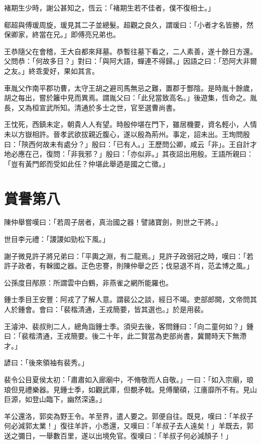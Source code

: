 褚期生少時，謝公甚知之，恆云：「褚期生若不佳者，僕不復相士。」

郗超與傅瑗周旋，瑗見其二子並總髮。超觀之良久，謂瑗曰：「小者才名皆勝，然保卿家，終當在兄。」即傅亮兄弟也。

王恭隨父在會稽，王大自都來拜墓。恭暫往墓下看之，二人素善，遂十餘日方還。父問恭：「何故多日？」對曰：「與阿大語，蟬連不得歸。」因語之曰：「恐阿大非爾之友。」終乖愛好，果如其言。

車胤父作南平郡功曹，太守王胡之避司馬無忌之難，置郡于酆陰。是時胤十餘歲，胡之每出，嘗於籬中見而異焉。謂胤父曰：「此兒當致高名。」後遊集，恆命之。胤長，又為桓宣武所知。清通於多士之世，官至選曹尚書。

王忱死，西鎮未定，朝貴人人有望。時殷仲堪在門下，雖居機要，資名輕小，人情未以方嶽相許。晉孝武欲拔親近腹心，遂以殷為荊州。事定，詔未出。王珣問殷曰：「陝西何故未有處分？」殷曰：「已有人。」王歷問公卿，咸云「非」。王自計才地必應在己，復問：「非我邪？」殷曰：「亦似非。」其夜詔出用殷。王語所親曰：「豈有黃門郎而受如此任？仲堪此舉迺是國之亡徵。」



\chapter{賞譽第八}

陳仲舉嘗嘆曰：「若周子居者，真治國之器！譬諸寶劍，則世之干將。」

世目李元禮：「謖謖如勁松下風。」

謝子微見許子將兄弟曰：「平輿之淵，有二龍焉。」見許子政弱冠之時，嘆曰：「若許子政者，有榦國之器。正色忠謇，則陳仲舉之匹；伐惡退不肖，范孟博之風。」

公孫度目邴原：所謂雲中白鶴，非燕雀之網所能羅也。

鍾士季目王安豐：阿戎了了解人意。謂裴公之談，經日不竭。吏部郎闕，文帝問其人於鍾會。會曰：「裴楷清通，王戎簡要，皆其選也。」於是用裴。

王濬沖、裴叔則二人，總角詣鍾士季。須臾去後，客問鍾曰：「向二童何如？」鍾曰：「裴楷清通，王戎簡要。後二十年，此二賢當為吏部尚書，冀爾時天下無滯才。」

諺曰：「後來領袖有裴秀。」

裴令公目夏侯太初：「肅肅如入廊廟中，不脩敬而人自敬。」一曰：「如入宗廟，琅琅但見禮樂器。見鍾士季，如觀武庫，但覩矛戟。見傅蘭碩，江廧靡所不有。見山巨源，如登山臨下，幽然深遠。」

羊公還洛，郭奕為野王令。羊至界，遣人要之。郭便自往。既見，嘆曰：「羊叔子何必減郭太業！」復往羊許，小悉還，又嘆曰：「羊叔子去人遠矣！」羊既去，郭送之彌日，一舉數百里，遂以出境免官。復嘆曰：「羊叔子何必減顏子！」

